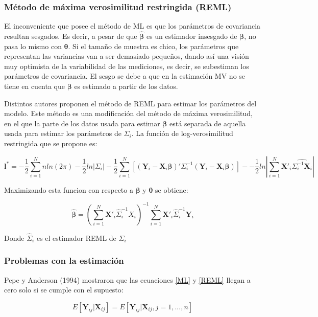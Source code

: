 \documentclass[spanish]{article}
\numberwithin{figure}{subsection}
\numberwithin{equation}{subsection}
\numberwithin{table}{subsection}
\begin{document}
\subsubsection{Método de máxima verosimilitud restringida (REML)}

El inconveniente que posee el método de ML es que los parámetros de covariancia
resultan sesgados. Es decir, a pesar de que $\bm{\hat{\beta}}$ es un estimador
insesgado de $\bm{\beta}$, no pasa lo mismo con $\bm{\theta}$. Si el tamaño de
muestra es chico, los parámetros que representan las variancias van a ser
demasiado pequeños, dando así una visión muy optimista de la variabilidad de las
mediciones, es decir, se subestiman los parámetros de covariancia. El sesgo se
debe a que en la estimación MV no se tiene en cuenta que $\bm{\beta}$ es
estimado a partir de los datos.

Distintos autores proponen el método de REML para estimar los parámetros del
modelo. Este método es una modificación del método de máxima verosimilitud, en
el que la parte de los datos usada para estimar $\bm{\beta}$ está separada de
aquella usada para estimar los parámetros de $\bm{\varSigma}_i$. La función de
log-verosimilitud restringida que se propone es:

\begin{equation}
\label{REML}
	\bm{l}^* = -\frac{1}{2} \sum_{i=1}^{N}n ln(2\pi) - \frac{1}{2}ln|\bm{\varSigma}_i| -
	\frac{1}{2} \sum_{i=1}^{N} [(\bm{Y}_i - \bm{X}_i\bm{\beta})'
	\bm{\varSigma}_i^{-1} (\bm{Y}_i - \bm{X}_i\bm{\beta})] -
	- \frac{1}{2} ln |\sum_{i=1}^{N} \bm{X}'_i \hat{\bm{\varSigma}_i^{-1} \bm{X}_i}|
\end{equation}

Maximizando esta funcion con respecto a $\bm{\beta}$ y $\bm{\theta}$ se obtiene:

\[ \hat{\bm{\beta}} = (\sum_{i=1}^{N} \bm{X}'_i \hat{\bm{\varSigma}}_i^{-1} X_i)^{-1}
\sum_{i=1}^{N} \bm{X}'_i \hat{\bm{\varSigma}}_i^{-1} \bm{Y}_i\]

Donde $\hat{\bm{\varSigma}}_i$ es el estimador REML de ${\bm{\varSigma}_i}$

\subsubsection{Problemas con la estimación}

Pepe y Anderson (1994) mostraron que las ecuaciones \ref{ML} y \ref{REML} llegan
a cero solo si se cumple con el supuesto:

\begin{equation}
\label{estimation_issue}
	E[\bm{Y}_{ij} | \bm{X}_{ij}] = E[\bm{Y}_{ij} | \bm{X}_{ij}, j = 1, ..., n]
\end{equation}
\end{document}
